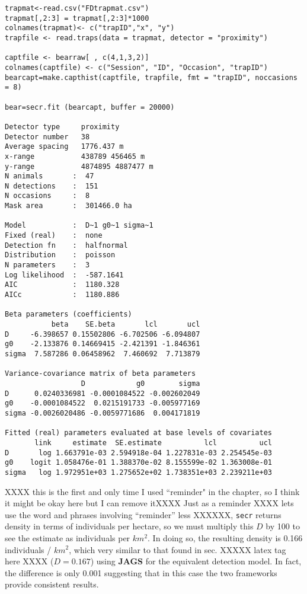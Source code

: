 {\small
\begin{verbatim}
trapmat<-read.csv("FDtrapmat.csv")
trapmat[,2:3] = trapmat[,2:3]*1000
colnames(trapmat)<- c("trapID","x", "y")
trapfile <- read.traps(data = trapmat, detector = "proximity")

captfile <- bearraw[ , c(4,1,3,2)] 
colnames(captfile) <- c("Session", "ID", "Occasion", "trapID")
bearcapt=make.capthist(captfile, trapfile, fmt = "trapID", noccasions = 8)

bear=secr.fit (bearcapt, buffer = 20000)

Detector type     proximity 
Detector number   38 
Average spacing   1776.437 m 
x-range           438789 456465 m 
y-range           4874895 4887477 m 
N animals       :  47  
N detections    :  151 
N occasions     :  8 
Mask area       :  301466.0 ha 

Model           :  D~1 g0~1 sigma~1 
Fixed (real)    :  none 
Detection fn    :  halfnormal 
Distribution    :  poisson 
N parameters    :  3 
Log likelihood  :  -587.1641 
AIC             :  1180.328 
AICc            :  1180.886 

Beta parameters (coefficients) 
           beta    SE.beta       lcl       ucl
D     -6.398657 0.15502806 -6.702506 -6.094807
g0    -2.133876 0.14669415 -2.421391 -1.846361
sigma  7.587286 0.06458962  7.460692  7.713879

Variance-covariance matrix of beta parameters 
                  D            g0        sigma
D      0.0240336981 -0.0001084522 -0.002602049
g0    -0.0001084522  0.0215191733 -0.005977169
sigma -0.0026020486 -0.0059771686  0.004171819

Fitted (real) parameters evaluated at base levels of covariates 
       link     estimate  SE.estimate          lcl          ucl
D       log 1.663791e-03 2.594918e-04 1.227831e-03 2.254545e-03
g0    logit 1.058476e-01 1.388370e-02 8.155599e-02 1.363008e-01
sigma   log 1.972951e+03 1.275652e+02 1.738351e+03 2.239211e+03
\end{verbatim}
}


XXXX this is the first and only time I used ``reminder" in the chapter,
 so I think it might be okay here but I can remove itXXXX
Just as a reminder XXXX lets use the word and phrases involving
``reminder'' less XXXXXX, \mbox{\tt secr} returns density in terms of 
individuals per
hectare, so we must multiply this $D$ by 100 to see the estimate as
individuals per $km^2$.  In doing so, the resulting density is 0.166
individuals / $km^2$, which very similar to that found in sec. XXXXX
latex tag here XXXX ($D = 0.167$)
using {\bf JAGS} for the equivalent detection model. In fact, the difference 
is only 0.001 suggesting that in this case the two frameworks provide consistent
results.


